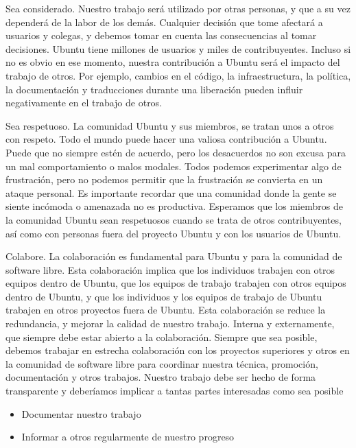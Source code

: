 {Sea considerado. Nuestro trabajo será utilizado por otras personas, y que a su vez dependerá de la labor de los demás. Cualquier decisión que tome afectará a usuarios y colegas, y debemos tomar en cuenta las consecuencias al tomar decisiones. Ubuntu tiene millones de usuarios y miles de contribuyentes. Incluso si no es obvio en ese momento, nuestra contribución a Ubuntu será el impacto del trabajo de otros. Por ejemplo, cambios en el código, la infraestructura, la política, la documentación y traducciones durante una liberación pueden influir negativamente en el trabajo de otros.

Sea respetuoso. La comunidad Ubuntu y sus miembros, se tratan unos a otros con respeto. Todo el mundo puede hacer una valiosa contribución a Ubuntu. Puede que no siempre estén de acuerdo, pero los desacuerdos no son excusa para un mal comportamiento o malos modales. Todos podemos experimentar algo de frustración, pero no podemos permitir que la frustración se convierta en un ataque personal. Es importante recordar que una comunidad donde la gente se siente incómoda o amenazada no es productiva. Esperamos que los miembros de la comunidad Ubuntu sean respetuosos cuando se trata de otros contribuyentes, así como con personas fuera del proyecto Ubuntu y con los usuarios de Ubuntu.

Colabore. La colaboración es fundamental para Ubuntu y para la comunidad de software libre. Esta colaboración implica que los individuos trabajen con otros equipos dentro de Ubuntu, que los equipos de trabajo trabajen con otros equipos dentro de Ubuntu, y que los individuos y los equipos de trabajo de Ubuntu trabajen en otros proyectos fuera de Ubuntu. Esta colaboración se reduce la redundancia, y mejorar la calidad de nuestro trabajo. Interna y externamente, que siempre debe estar abierto a la colaboración. Siempre que sea posible, debemos trabajar en estrecha colaboración con los proyectos superiores y otros en la comunidad de software libre para coordinar nuestra técnica, promoción, documentación y otros trabajos. Nuestro trabajo debe ser hecho de forma transparente y deberíamos implicar a tantas partes interesadas como sea posible}

\begin{itemize}
\item Documentar nuestro trabajo
\item Informar a otros regularmente de nuestro progreso
\end{itemize}


